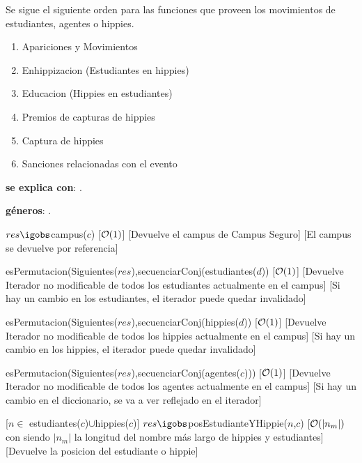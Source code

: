 
Se sigue el siguiente orden para las funciones que proveen los movimientos de estudiantes, agentes o hippies.
\begin{enumerate}
	\item Apariciones y Movimientos
	\item Enhippizacion (Estudiantes en hippies)
	\item Educacion (Hippies en estudiantes)
	\item Premios de capturas de hippies
	\item Captura de hippies
	\item Sanciones relacionadas con el evento
\end{enumerate}

\begin{Interfaz}

	\textbf{se explica con}: .

	\textbf{géneros}: .


	{$res \igobs $campus($c$)}
	[$\mathcal{O}(1)$]
	[Devuelve el campus de Campus Seguro]
	[El campus se devuelve por referencia]

	{esPermutacion(Siguientes($res$),secuenciarConj(estudiantes($d$))}
	[$\mathcal{O}(1)$]
	[Devuelve Iterador no modificable de todos los estudiantes actualmente en el campus]
	[Si hay un cambio en los estudiantes, el iterador puede quedar invalidado]
  
	{esPermutacion(Siguientes($res$),secuenciarConj(hippies($d$))}
	[$\mathcal{O}(1)$]
	[Devuelve Iterador no modificable de todos los hippies actualmente en el campus]
	[Si hay un cambio en los hippies, el iterador puede quedar invalidado]

	{esPermutacion(Siguientes($res$),secuenciarConj(agentes($c$)))}
	[$\mathcal{O}(1)$]
	[Devuelve Iterador no modificable de todos los agentes actualmente en el campus]
	[Si hay un cambio en el diccionario, se va a ver reflejado en el iterador]

	[$n \in$ estudiantes($c$)$\cup$hippies($c$)]
	{$res \igobs$posEstudianteYHippie($n$,$c$)}
	[$\mathcal{O}(|n_m|)$ con siendo $|n_m|$ la longitud del nombre más largo de hippies y estudiantes]
	[Devuelve la posicion del estudiante o hippie]


\end{Interfaz}
